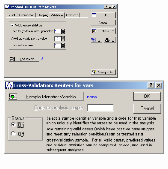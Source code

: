 \begin{figure}[!h]
  \centering

  \begin{minipage}{0.49\textwidth}
    \centering

    \includegraphics[height=4cm]
    {inc/var5/27.PNG}

    \caption{\_}

    \label{fig:var5_27}
  \end{minipage}
  \begin{minipage}{0.49\textwidth}
    \centering

    \includegraphics[height=4cm]
    {inc/var5/28.PNG}

    \caption{\_}

    \label{fig:var5_28}
  \end{minipage}
\end{figure}


